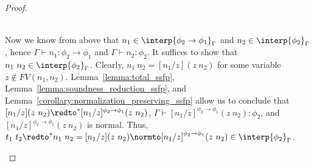 \begin{proof}
\begin{itemize}
  \ \\
  Now we know from above that $n_1 \in \interp{\phi_2 \rightarrow \phi_1}_\Gamma$ and
  $n_2 \in \interp{\phi_2}_\Gamma$, hence $\Gamma \vdash n_1:\phi_2 \to \phi_1$ and
  $\Gamma \vdash n_2:\phi_2$.  It suffices to show that $n_1\ n_2 \in \interp{\phi_2}_\Gamma$.
  Clearly, $n_1\ n_2 = [n_1/z](z\ n_2)$ for some variable $z \not \in FV(n_1,n_2)$.  
  Lemma~\ref{lemma:total_ssfp}, Lemma~\ref{lemma:soundness_reduction_ssfp}, 
  and Lemma~\ref{corollary:normalization_preserving_ssfp} allow us to conclude that 
  $[n_1/z](z\ n_2) \redto^* [n_1/z]^{\phi_2 \to \phi_1}(z\ n_2)$, $\Gamma \vdash [n_1/z]^{\phi_2 \to \phi_1}(z\ n_2):\phi_2$,
  and $[n_1/z]^{\phi_2 \to \phi_1}(z\ n_2)$ is normal.  Thus, 
  $t_1\ t_2 \redto^* n_1\ n_2 = [n_1/z](z\ n_2) \normto [n_1/z]^{\phi_2 \to \phi_1}(z\ n_2) \in \interp{\phi_2}_\Gamma$.
  
  

\end{itemize}
\end{proof}
